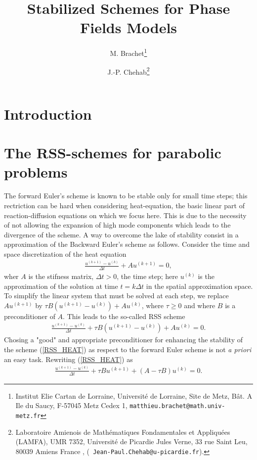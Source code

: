 \documentclass[11pt]{article}
\newcommand{\Frac}[2] {\frac{\textstyle #1} {\textstyle #2}}
\begin{document}
\title{Stabilized Schemes for Phase Fields Models}
\author{M. Brachet\thanks{Institut Elie Cartan de Lorraine, Universit\'e de Lorraine, Site de Metz, B\^at. A Ile du Saucy, F-57045 Metz Cedex 1, {\tt matthieu.brachet@math.univ-metz.fr}} \and J.-P. Chehab\thanks{
Laboratoire Amienois de Math\'ematiques Fondamentales et Appliqu\'ees (LAMFA), {\small UMR} 7352,
 Universit\'e de Picardie Jules Verne, 33 rue Saint Leu, 80039 Amiens France
 , ({\tt
 Jean-Paul.Chehab@u-picardie.fr}).} }




\maketitle

%
%



\begin{abstract}
\end{abstract}
\section{Introduction}
%
%
\section{The RSS-schemes for parabolic problems}
The forward Euler's scheme is known to be stable only for small time steps; this rectriction can be hard when considering heat-equation, the basic linear part of reaction-diffusion equations on which we focus here. This is due to the necessity of not allowing the expansion of high mode components which leads to the divergence of the scheme.
A way to overcome the lake of stability consist in a approximation of the Backward Euler's scheme as follows. Consider the time and space discretization of the heat equation
\begin{eqnarray}\label{BE_HEAT}
\Frac{u^{(k+1)}-u^{(k)}}{\Delta t}+Au^{(k+1)}=0,
\end{eqnarray}
wher $A$ is the stifness matrix, $\Delta t>0$, the time step; here $u^{(k)}$ is the approximation of the solution at time $t=k\Delta t$ in the spatial approximation space. To simplify the linear system that must be solved at each step,  we replace $Au^{(k+1)}$ by
$\tau B (u^{(k+1)}-u^{(k)}) +Au^{(k)}$, where $\tau\ge 0$ and where $B$ is a preconditioner of $A$. This leads to the so-called RSS scheme
\begin{eqnarray}\label{RSS_HEAT}
\Frac{u^{(k+1)}-u^{(k)}}{\Delta t}+\tau B (u^{(k+1)}-u^{(k)}) +Au^{(k)}=0.
\end{eqnarray}
Chosing a "good" and appropriate preconditioner for enhancing the stability of the scheme
(\ref{RSS_HEAT}) as respect to the forward Euler scheme is not {\it a priori} an easy task. Rewriting (\ref{RSS_HEAT}) as
\begin{eqnarray}\label{RSS_HEAT2}
\Frac{u^{(k+1)}-u^{(k)}}{\Delta t}+\tau B u^{(k+1)} +(A-\tau B)u^{(k)}=0.
\end{eqnarray}
\end{document}
